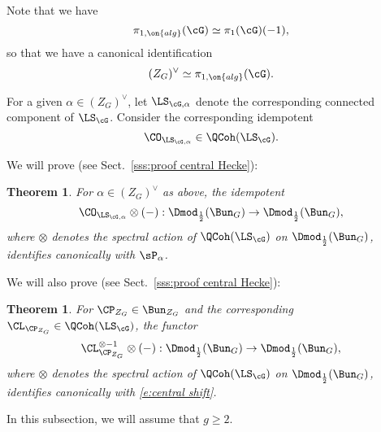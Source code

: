 \documentclass[9pt]{amsart}
\newtheorem{prop}[subsubsection]{Proposition}
\newtheorem{thm}[subsubsection]{Theorem}
\theoremstyle{remark}
\theoremstyle{definition}
\theoremstyle{remark}
\newcommand{\secref}[1]{Sect.~\ref{#1}}
\numberwithin{equation}{section}
\begin{document}
\medskip

Note that we have 
$$\pi_{1,\on{alg}}(\cG)\simeq \pi_1(\cG)(-1),$$
so that we have a canonical identification
$$(Z_G)^\vee\simeq \pi_{1,\on{alg}}(\cG).$$

\sssec{}

For a given $\alpha\in (Z_G)^\vee$, let $\LS_{\cG,\alpha}$ denote the corresponding connected component of
$\LS_\cG$. Consider the corresponding idempotent
$$\CO_{\LS_{\cG,\alpha}}\in \QCoh(\LS_\cG).$$

We will prove (see \secref{sss:proof central Hecke}):

\begin{thm} \label{t:Hecke Z 0}
For $\alpha\in (Z_G)^\vee$ as above, the idempotent 
$$\CO_{\LS_{\cG,\alpha}}\otimes (-):\Dmod_{\frac{1}{2}}(\Bun_G)\to \Dmod_{\frac{1}{2}}(\Bun_G),$$
where $\otimes$ denotes the spectral action of $\QCoh(\LS_\cG)$ on $\Dmod_{\frac{1}{2}}(\Bun_G)$,
identifies canonically with $\sP_{\alpha}$.
\end{thm}

\sssec{}

We will also prove (see \secref{sss:proof central Hecke}):

\begin{thm} \label{t:Hecke Z 1}
For $\CP_{Z_G}\in \Bun_{Z_G}$ and the corresponding $\CL_{\CP_{Z_G}}\in \QCoh(\LS_\cG)$,
the functor 
$$\CL^{\otimes -1}_{\CP_{Z_G}}\otimes(-):\Dmod_{\frac{1}{2}}(\Bun_G)\to \Dmod_{\frac{1}{2}}(\Bun_G),$$
where $\otimes$ denotes the spectral action of $\QCoh(\LS_\cG)$ on $\Dmod_{\frac{1}{2}}(\Bun_G)$,
identifies canonically with \eqref{e:central shift}.
\end{thm} 
%
%


In this subsection, we will assume that $g\geq 2$. 
\end{document}
